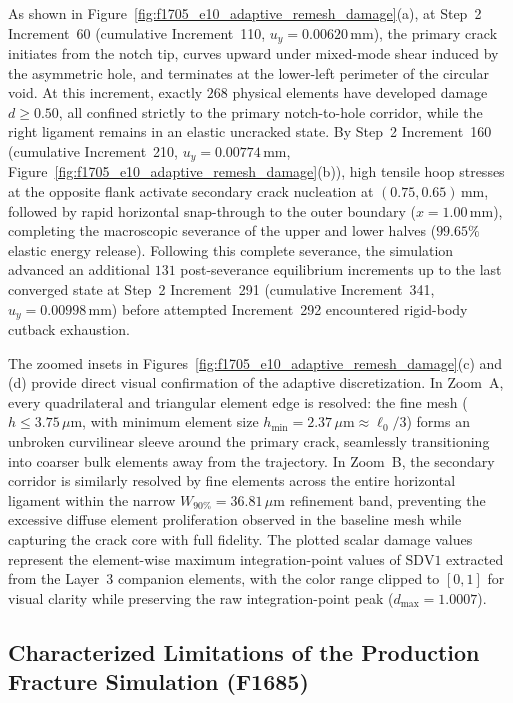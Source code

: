 As shown in Figure~\ref{fig:f1705_e10_adaptive_remesh_damage}(a), at Step~2 Increment~60 (cumulative Increment~110, $u_y = 0.00620\,\mathrm{mm}$), the primary crack initiates from the notch tip, curves upward under mixed-mode shear induced by the asymmetric hole, and terminates at the lower-left perimeter of the circular void. At this increment, exactly $268$ physical elements have developed damage $d \ge 0.50$, all confined strictly to the primary notch-to-hole corridor, while the right ligament remains in an elastic uncracked state. By Step~2 Increment~160 (cumulative Increment~210, $u_y = 0.00774\,\mathrm{mm}$, Figure~\ref{fig:f1705_e10_adaptive_remesh_damage}(b)), high tensile hoop stresses at the opposite flank activate secondary crack nucleation at $(0.75, 0.65)\,\mathrm{mm}$, followed by rapid horizontal snap-through to the outer boundary ($x = 1.00\,\mathrm{mm}$), completing the macroscopic severance of the upper and lower halves ($99.65\%$ elastic energy release). Following this complete severance, the simulation advanced an additional $131$ post-severance equilibrium increments up to the last converged state at Step~2 Increment~291 (cumulative Increment~341, $u_y = 0.00998\,\mathrm{mm}$) before attempted Increment~292 encountered rigid-body cutback exhaustion.

The zoomed insets in Figures~\ref{fig:f1705_e10_adaptive_remesh_damage}(c) and (d) provide direct visual confirmation of the adaptive discretization. In Zoom~A, every quadrilateral and triangular element edge is resolved: the fine mesh ($h \le 3.75\,\mu\mathrm{m}$, with minimum element size $h_{\min} = 2.37\,\mu\mathrm{m} \approx \ell_0/3$) forms an unbroken curvilinear sleeve around the primary crack, seamlessly transitioning into coarser bulk elements away from the trajectory. In Zoom~B, the secondary corridor is similarly resolved by fine elements across the entire horizontal ligament within the narrow $W_{90\%} = 36.81\,\mu\mathrm{m}$ refinement band, preventing the excessive diffuse element proliferation observed in the baseline mesh while capturing the crack core with full fidelity. The plotted scalar damage values represent the element-wise maximum integration-point values of $\mathrm{SDV1}$ extracted from the Layer~3 companion elements, with the color range clipped to $[0, 1]$ for visual clarity while preserving the raw integration-point peak ($d_{\max} = 1.0007$).

\subsection{Characterized Limitations of the Production Fracture Simulation (F1685)}
\label{subsec:f1685_limitations_stated}

